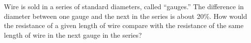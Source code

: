        Wire is sold in a series of standard diameters, called
        ``gauges.'' The difference in diameter between one gauge and
        the next in the series is about 20\%. How would the
        resistance of a given length of wire 
        compare with the resistance of the same length of wire in
        the next gauge in the series?
        \answercheck
